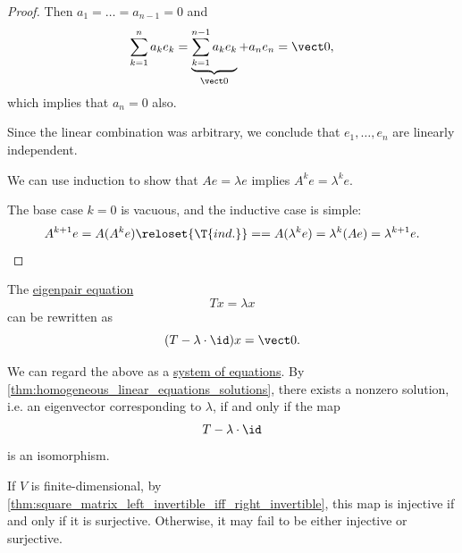 \begin{proof}
  Then \( a_1 = \ldots = a_{n-1} = 0 \) and
  \begin{equation*}
    \sum_{k=1}^n a_k e_k = \underbrace{\sum_{k=1}^{n-1} a_k e_k}_{\vect 0} + a_n e_n = \vect 0,
  \end{equation*}
  which implies that \( a_n = 0 \) also.

  Since the linear combination was arbitrary, we conclude that \( e_1, \ldots, e_n \) are linearly independent.

   We can use induction to show that \( Ae = \lambda e \) implies \( A^k e = \lambda ^k e \).

  The base case \( k = 0 \) is vacuous, and the inductive case is simple:
  \begin{equation*}
    A^{k+1} e
    =
    A (A^k e)
    \reloset {\T{ind.}} =
    =
    A (\lambda^k e)
    =
    \lambda^k (Ae)
    =
    \lambda^{k+1} e.
  \end{equation*}
\end{proof}

\begin{remark}\label{rem:eigenpairs_via_invertibility}
  The \hyperref[def:eigenpair]{eigenpair equation}
  \begin{equation*}
    Tx = \lambda x
  \end{equation*}
  can be rewritten as
  \begin{equation*}
    (T - \lambda \cdot \id) x = \vect 0.
  \end{equation*}

  We can regard the above as a \hyperref[def:system_of_linear_equations]{system of equations}. By \cref{thm:homogeneous_linear_equations_solutions}, there exists a nonzero solution, i.e. an eigenvector corresponding to \( \lambda \), if and only if the map
  \begin{equation*}
    T - \lambda \cdot \id
  \end{equation*}
  is an isomorphism.

  If \( V \) is finite-dimensional, by \cref{thm:square_matrix_left_invertible_iff_right_invertible}, this map is injective if and only if it is surjective. Otherwise, it may fail to be either injective or surjective.
\end{remark}

